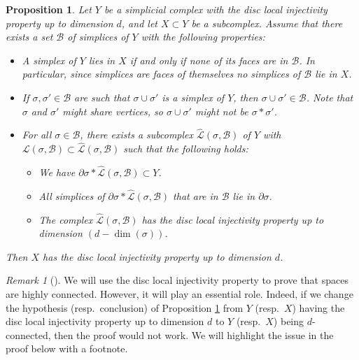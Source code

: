 \documentclass[11pt]{amsart}
\numberwithin{equation}{section}
\theoremstyle{plain}
\newtheorem{proposition}[theorem]{Proposition}
\theoremstyle{definition}
\theoremstyle{remark}
\newtheorem{rmk}[theorem]{Remark}
\newenvironment{remark}[1][]{\begin{rmk}[#1] \pushQED{\qed}}{\popQED \end{rmk}}
\newcommand\cB{\ensuremath{\mathcal{B}}}
\newcommand\cL{\ensuremath{\mathcal{L}}}
\newcommand\hcL{\ensuremath{\widehat{\cL}}}
\begin{document}
\begin{proposition}
\label{proposition:avoidbadhard}
Let $Y$ be a simplicial complex with the disc local injectivity property up to dimension $d$, and let $X \subset Y$ be a subcomplex.
Assume that there exists a set $\cB$ of simplices of $Y$ with the following properties:
\begin{itemize}
\item[(i)] A simplex of $Y$ lies in $X$ if and only if none of its faces are in $\cB$. 
In particular, since simplices are faces of themselves no simplices of $\cB$ lie in $X$.
\item[(ii)] If $\sigma,\sigma' \in \cB$ are such that $\sigma \cup \sigma'$ is a simplex
of $Y$, then $\sigma \cup \sigma' \in \cB$.  Note that $\sigma$ and $\sigma'$ might share vertices,
so $\sigma \cup \sigma'$ might not be $\sigma \ast \sigma'$.
\item[(iii)] For all $\sigma \in \cB$, there exists a subcomplex $\hcL(\sigma,\cB)$ of $Y$ with
$\cL(\sigma,\cB) \subset \hcL(\sigma,\cB)$ such that the following holds:
\begin{itemize}
\item[a.] We have $\partial \sigma \ast \hcL(\sigma,\cB) \subset Y$.
\item[b.] All simplices of $\partial \sigma \ast \hcL(\sigma,\cB)$ that are in $\cB$ lie in
$\partial \sigma$.
\item[c.] The complex $\hcL(\sigma,\cB)$ has the disc local injectivity property
up to dimension $(d-\dim(\sigma))$.
\end{itemize}
\end{itemize}
Then $X$ has the disc local injectivity property up to dimension $d$.
\end{proposition}

\begin{remark}
We will use the disc local injectivity property to prove that spaces are highly connected.
However, it will play an essential role.  Indeed, if we change the hypothesis (resp.\ conclusion)
of Proposition \ref{proposition:avoidbadhard} from $Y$ (resp.\ $X$) having the disc local injectivity property
up to dimension $d$ to $Y$ (resp.\ $X$) being $d$-connected, then the proof would not
work.  We will highlight the issue in the proof below with a footnote.
\end{remark}
\end{document}
